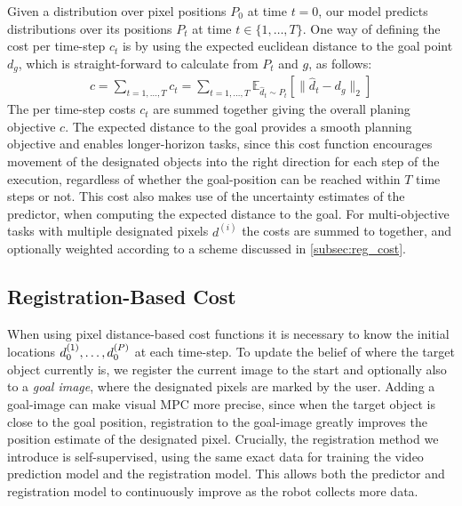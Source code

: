 Given a distribution over pixel positions $P_0$ at time $t = 0$, our model predicts distributions over its positions $P_t$ at time $t \in \{ 1, \dots, T \}$. One way of defining the cost per time-step $c_t$ is by using the expected euclidean
distance to the goal point $d_g$, which is straight-forward to calculate from $P_t$ and $g$, as follows:
 \begin{align}
c = \sum_{t = 1, \dots, T} c_t =  \sum_{t = 1, \dots, T} \mathbb{E}_{\hat{d}_{t} \sim P_{t}} \left[\|\hat{d}_{t} - d_{g}\|_2\right] 
 \label{eq:cost}
 \end{align}
The per time-step costs $c_t$ are summed together giving the overall planing objective $c$. 
The expected distance to the goal provides a smooth planning objective and enables longer-horizon tasks, since this cost function encourages movement of the designated objects into the right direction for each step of the execution, regardless of whether the goal-position can be reached within $T$ time steps or not. This cost also makes use of the uncertainty estimates of the predictor, when computing the expected distance to the goal. For multi-objective tasks with multiple designated pixels $d^{(i)}$ the costs are summed to together, and optionally weighted according to a scheme discussed in \autoref{subsec:reg_cost}.  

\subsection{Registration-Based Cost}
\label{subsec:reg_cost}
When using pixel distance-based cost functions it is necessary to know the initial locations $d_0^{(1)}, \dots, d_0^{(P)}$ at each time-step.
To update the belief of where the target object currently is, we register the current image to the start and optionally also to a \emph{goal image}, where the designated pixels are marked by the user. Adding a goal-image can make visual MPC
more precise, since when the target object is close to the goal position, registration to the goal-image greatly improves the position estimate of the designated pixel. Crucially, the registration method we introduce is self-supervised, using the same exact data for training the video prediction model and the registration model. This allows both the predictor and registration model to continuously improve as the robot collects more data.


